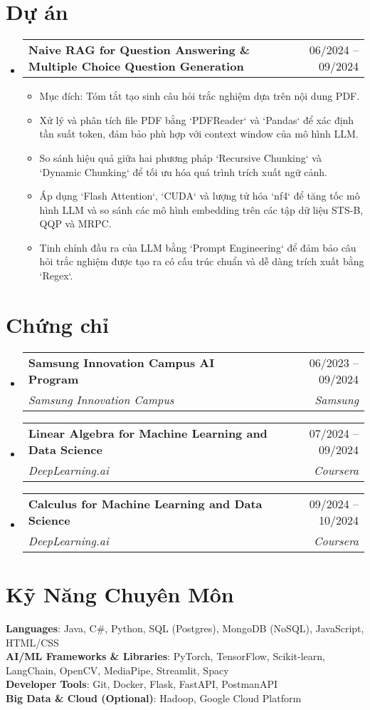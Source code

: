 \documentclass[letterpaper,11pt]{article}
\makeatletter
\newcommand{\resumeItem}[1]{
	\item\small{
	{#1 \vspace{-2pt}}
	}
}
\newcommand{\resumeSubheading}[4]{
	\vspace{-2pt}\item
	\begin{tabular*}{0.97\textwidth}[t]{l@{\extracolsep{\fill}}r}
		\textbf{#1} & #2 \\
		\textit{\small#3} & \textit{\small #4} \\
	\end{tabular*}\vspace{-7pt}
}
\newcommand{\resumeProjectHeading}[2]{
	\item
	\begin{tabular*}{0.97\textwidth}{l@{\extracolsep{\fill}}r}
		\small#1 & #2 \\
	\end{tabular*}\vspace{-7pt}
}
\newcommand{\resumeSubHeadingListStart}{\begin{itemize}[leftmargin=0.15in, label={}]}
\newcommand{\resumeSubHeadingListEnd}{\end{itemize}}
\newcommand{\resumeItemListStart}{\begin{itemize}}
\newcommand{\resumeItemListEnd}{\end{itemize}\vspace{-5pt}}
\makeatother
\begin{document}
\section{Dự án}
	\resumeSubHeadingListStart
		\resumeProjectHeading %
			{\textbf{Naive RAG for Question Answering \& Multiple Choice Question Generation}}{06/2024 -- 09/2024}
			\resumeItemListStart
				\resumeItem{Mục đích: Tóm tắt  tạo sinh câu hỏi trắc nghiệm dựa trên nội dung PDF.}
				\resumeItem{Xử lý và phân tích file PDF bằng `PDFReader` và `Pandas` để xác định tần suất token, đảm bảo phù hợp với context window của mô hình LLM.}
				\resumeItem{So sánh hiệu quả giữa hai phương pháp `Recursive Chunking` và `Dynamic Chunking` để tối ưu hóa quá trình trích xuất ngữ cảnh.}
				\resumeItem{Áp dụng `Flash Attention`, `CUDA` và lượng tử hóa `nf4` để tăng tốc mô hình LLM và so sánh các mô hình embedding trên các tập dữ liệu STS-B, QQP và MRPC.}
				\resumeItem{Tinh chỉnh đầu ra của LLM bằng `Prompt Engineering` để đảm bảo câu hỏi trắc nghiệm được tạo ra có cấu trúc chuẩn và dễ dàng trích xuất bằng `Regex`.}
			\resumeItemListEnd


	\resumeSubHeadingListEnd

\section{Chứng chỉ}
	\resumeSubHeadingListStart
		\resumeSubheading
			{Samsung Innovation Campus AI Program}{06/2023 -- 09/2024}
			{Samsung Innovation Campus}{Samsung}

		\resumeSubheading
			{Linear Algebra for Machine Learning and Data Science}{07/2024 -- 09/2024}
			{DeepLearning.ai}{Coursera}

		\resumeSubheading
			{Calculus for Machine Learning and Data Science} {09/2024 -- 10/2024}
			{DeepLearning.ai}{Coursera}
	\resumeSubHeadingListEnd

\section{Kỹ Năng Chuyên Môn}
\begin{itemize}[leftmargin=0.15in, label={}]
\small{\item{
	\textbf{Languages}{: Java, C\#, Python, SQL (Postgres), MongoDB (NoSQL), JavaScript, HTML/CSS} \\
	\textbf{AI/ML Frameworks \& Libraries}{: PyTorch, TensorFlow, Scikit-learn, LangChain, OpenCV, MediaPipe, Streamlit, Spacy} \\
	\textbf{Developer Tools}{: Git, Docker, Flask, FastAPI, PostmanAPI} \\
	\textbf{Big Data \& Cloud (Optional)}{: Hadoop, Google Cloud Platform}
}}
\end{itemize}
\end{document}
